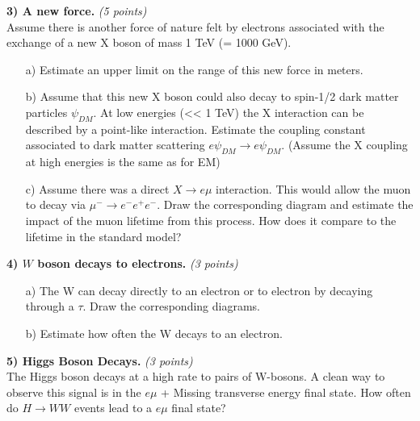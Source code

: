 {\textbf{3) A new force. } \hfill \textit{(5 points)}\\
Assume there is another force of nature felt by electrons associated with the exchange of a new X boson of mass 1 TeV (= 1000 GeV).
\begin{itemize}
\item[a)]{ Estimate an upper limit on the range of this new force in meters.
}
\item[b)]{ Assume that this new X boson could also decay to spin-1/2 dark matter particles $\psi_{DM}$. At low energies (<< 1 TeV) the X interaction can be described by a point-like interaction. Estimate the coupling constant associated to dark matter scattering $e \psi_{DM} \rightarrow e \psi_{DM}$.   (Assume the X coupling at high energies is the same as for EM)  }
\item[c)]{ Assume there was a direct $X\rightarrow e\mu$ interaction. This would allow the muon to decay via $\mu^- \rightarrow e^-e^+e^-$. Draw the corresponding diagram and estimate the impact of the muon lifetime from this process.  How does it compare to the lifetime in the standard model?     }
\end{itemize}

\clearpage

\textbf{4)  $W$ boson decays to electrons. } \hfill \textit{(3 points)}\\
\begin{itemize}
\item[a)]{ The W can decay directly to an electron or to electron by decaying through a $\tau$. Draw the corresponding diagrams.}
\item[b)]{ Estimate how often the W decays to an electron. }
\end{itemize}           

\vspace*{0.25in}

\textbf{5) Higgs Boson Decays. } \hfill \textit{(3 points)}\\
The Higgs boson decays at a high rate to pairs of W-bosons.
A clean way to observe this signal is in the $e\mu$ + Missing transverse energy final state. How often do $H\rightarrow WW$ events lead to a $e\mu$ final state?

\vspace*{0.25in}

}
